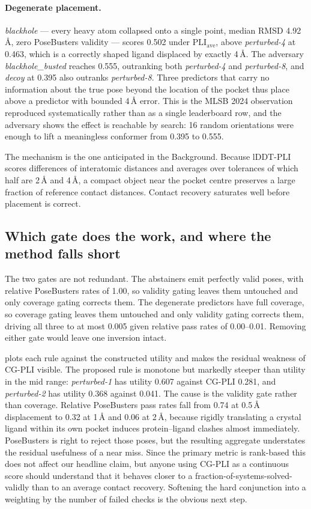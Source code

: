\documentclass{article} %
\begin{document}
\paragraph{Degenerate placement.} \emph{blackhole} --- every heavy atom collapsed onto a
single point, median RMSD 4.92\,\AA{}, zero PoseBusters validity --- scores 0.502 under
$\mathrm{PLI}_{\text{ave}}$, above \emph{perturbed-4} at 0.463, which is a correctly
shaped ligand displaced by exactly 4\,\AA{}. The adversary \emph{blackhole\_busted}
reaches 0.555, outranking both \emph{perturbed-4} and \emph{perturbed-8}, and
\emph{decoy} at 0.395 also outranks \emph{perturbed-8}. Three predictors that carry no
information about the true pose beyond the location of the pocket thus place above a
predictor with bounded 4\,\AA{} error. This is the MLSB 2024 observation reproduced
systematically rather than as a single leaderboard row, and the adversary shows the
effect is reachable by search: 16 random orientations were enough to lift a meaningless
conformer from 0.395 to 0.555.

The mechanism is the one anticipated in the Background. Because lDDT-PLI scores
differences of interatomic distances and averages over tolerances of which half are
2\,\AA{} and 4\,\AA{}, a compact object near the pocket centre preserves a large
fraction of reference contact distances. Contact recovery saturates well before
placement is correct.

\subsection{Which gate does the work, and where the method falls short}

The two gates are not redundant. The abstainers emit perfectly valid poses, with relative
PoseBusters rates of 1.00, so validity gating leaves them untouched and only coverage
gating corrects them. The degenerate predictors have full coverage, so coverage gating
leaves them untouched and only validity gating corrects them, driving all three to at
most 0.005 given relative pass rates of 0.00--0.01. Removing either gate would leave one
inversion intact.

 plots each rule against the constructed utility and makes the residual
weakness of CG-PLI visible. The proposed rule is monotone but markedly steeper than
utility in the mid range: \emph{perturbed-1} has utility 0.607 against CG-PLI 0.281, and
\emph{perturbed-2} has utility 0.368 against 0.041. The cause is the validity gate rather
than coverage. Relative PoseBusters pass rates fall from 0.74 at 0.5\,\AA{} displacement
to 0.32 at 1\,\AA{} and 0.06 at 2\,\AA{}, because rigidly translating a crystal ligand
within its own pocket induces protein--ligand clashes almost immediately. PoseBusters is
right to reject those poses, but the resulting aggregate understates the residual
usefulness of a near miss. Since the primary metric is rank-based this does not affect
our headline claim, but anyone using CG-PLI as a continuous score should understand that
it behaves closer to a fraction-of-systems-solved-validly than to an average contact
recovery. Softening the hard conjunction into a weighting by the number of failed checks
is the obvious next step.
\end{document}
